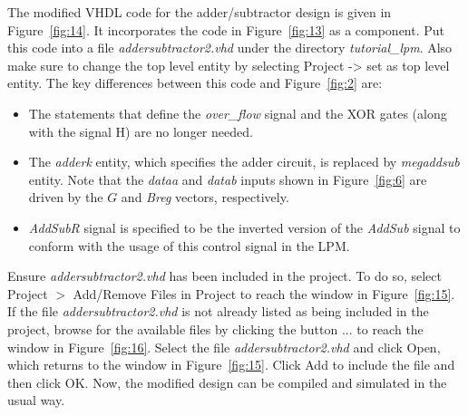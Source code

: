 \documentclass[11pt, twoside, pdftex]{article}
\begin{document}
The modified VHDL code for the adder/subtractor design is given in Figure~\ref{fig:14}.
It incorporates the code in Figure~\ref{fig:13} as a component. Put this code into a file
{\it addersubtractor2.vhd} under the directory {\it tutorial\_lpm}.  Also make sure to change the top level entity by selecting Project -> set as top level entity.
The key differences between this code and Figure~\ref{fig:2} are:
\begin{itemize}
\item The statements that define the {\it over\_flow} signal 
and the XOR gates (along with the signal H) are no longer needed.
\item The {\it adderk} entity, which specifies the adder circuit, is replaced 
by {\it megaddsub} entity. Note that the {\it dataa} and {\it datab} inputs shown 
in Figure~\ref{fig:6} are driven by the $G$ and {\it Breg} vectors, respectively.
\item {\it AddSubR} signal is specified to be the inverted version of the {\it AddSub}
signal to conform with the usage of this control signal in the LPM.
\end{itemize}

\newpage

\newpage


Ensure {\it addersubtractor2.vhd} has been included in the project. To do so,
select {\sf Project $>$ Add/Remove Files in Project} to reach the window in Figure~\ref{fig:15}.
If the file {\it addersubtractor2.vhd} is not already listed as being included 
in the project, browse for the available files by clicking the button
{\sf ...} to reach the window in Figure~\ref{fig:16}.
Select the file {\it addersubtractor2.vhd} and click {\sf Open}, which returns to the
window in Figure~\ref{fig:15}. Click {\sf Add} to include the file and then click {\sf OK}.
Now, the modified design can be compiled and simulated in the usual way.
\end{document}
